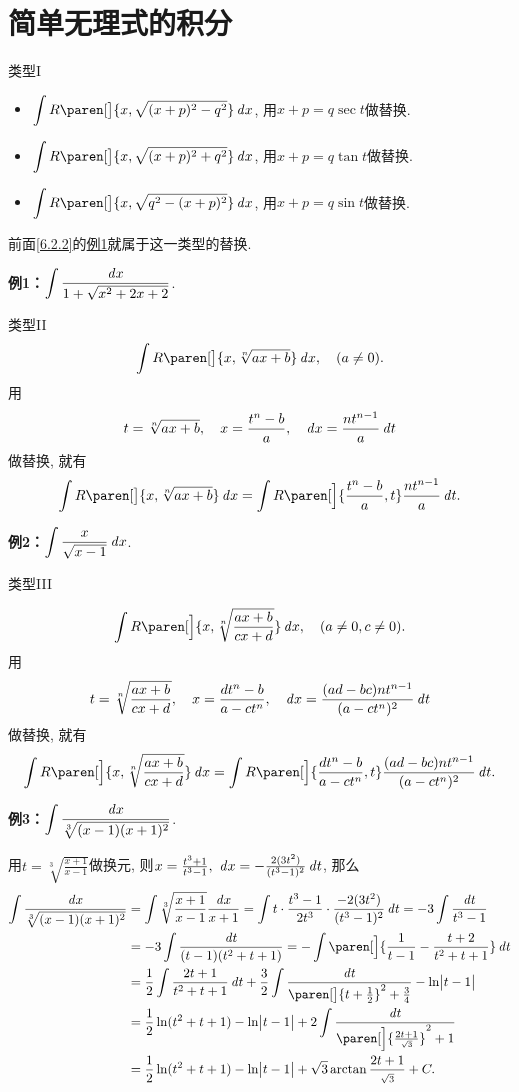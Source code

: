 \documentclass[a4paper,punct=CCT]{ctexbook}
\newcommand*{\ex}[2]{\textbf{例#1：}#2}
\newcommand*{\disp}[1]{\( \displaystyle #1 \)}
\newcommand*{\exds}[2]{\ex{#1}\disp{#2}}
\theoremstyle{break}
\begin{document}
\section{简单无理式的积分\label{6.5}}

类型I

\begin{itemize}
\item \(\displaystyle \int R\paren[\big]{x, \sqrt{(x+p)^2 - q^2}} \dx\), 用\(x + p = q \sec t\)做替换.
\item \(\displaystyle \int R\paren[\big]{x, \sqrt{(x+p)^2 + q^2}} \dx\), 用\(x + p = q \tan t\)做替换.
\item \(\displaystyle \int R\paren[\big]{x, \sqrt{q^2 - (x+p)^2}} \dx\), 用\(x + p = q \sin t\)做替换.
\end{itemize}

前面\ref{6.2.2}的\hyperlink{E:sinsub}{例1}就属于这一类型的替换.

\exds{1}{\int \frac{\dx}{1+\sqrt{x^2+2x+2}}}.

类型II
\[
  \int R\paren[\big]{x, \sqrt[n]{ax+b}} \dx, \quad (a \ne 0).
\]
用
\[
  t = \sqrt[n]{ax+b}, \quad
  x = \frac{t^n-b}{a}, \quad
  \mathop{}\!\mathit{d} x = \frac{nt^{n-1}}{a} \mathop{}\!\mathit{d} t
\]
做替换, 就有
\[
  \int R\paren[\big]{x, \sqrt[n]{ax+b}} \dx
  = \int R\paren[\Big]{\frac{t^n-b}{a}, t} \frac{nt^{n-1}}{a} \dt.
\]

\exds{2}{\int \frac{x}{\sqrt{x-1}} \dx}.

类型III

\[
  \int R\paren[\Big]{x, \sqrt[n]{\frac{ax+b}{cx+d}}} \dx, \quad (a \ne 0, c \ne 0).
\]
用
\[
  t = \sqrt[n]{\frac{ax+b}{cx+d}}, \quad
  x = \frac{dt^n-b}{a-ct^n}, \quad
  \mathop{}\!\mathit{d} x = \frac{(ad-bc)nt^{n-1}}{(a-ct^n)^2} \mathop{}\!\mathit{d} t
\]
做替换, 就有
\[
  \int R\paren[\Big]{x, \sqrt[n]{\frac{ax+b}{cx+d}}} \dx
  = \int R\paren[\Big]{\frac{dt^n-b}{a-ct^n}, t} \frac{(ad-bc)nt^{n-1}}{(a-ct^n)^2} \dt.
\]

\hypertarget{E:rootI}{}
\exds{3}{\int \frac{\dx}{\sqrt[3]{(x-1)(x+1)^2}}}.

用\(t = \sqrt[3]{\frac{x+1}{x-1}}\)做换元, 则\(x = \frac{t^3+1}{t^3-1},\ \mathop{}\!\mathit{d} x = -\frac{2(3t^2)}{(t^3-1)^2} \mathop{}\!\mathit{d} t\), 那么
\[
  \begin{split}
    \int \frac{\dx}{\sqrt[3]{(x-1)(x+1)^2}}
    &= \int \sqrt[3]{\frac{x+1}{x-1}} \frac{\dx}{x+1}
    = \int t \cdot \frac{t^3-1}{2t^3} \cdot \frac{-2(3t^2)}{(t^3-1)^2} \dt
    = -3 \int \frac{\dt}{t^3-1} \\
    &= -3 \int \frac{\dt}{(t-1)(t^2+t+1)}
    = - \int \paren[\Big]{\frac{1}{t-1} - \frac{t+2}{t^2+t+1}} \dt \\
    &= \frac12 \int \frac{2t+1}{t^2+t+1} \dt + \frac32 \int \frac{\dt}{\paren[\big]{t+\frac12}^2+\frac34} - \ln\abs[\big]{t-1} \\
    &= \frac12 \ln(t^2+t+1) - \ln\abs[\big]{t-1} + 2 \int \frac{\dt}{\paren[\Big]{\frac{2t+1}{\scriptscriptstyle\sqrt3}}^2 + 1} \\
    &= \frac12 \ln(t^2+t+1) - \ln\abs[\big]{t-1} + \sqrt3 \arctan \frac{2t+1}{\scriptstyle\sqrt3} + C.
  \end{split}
\]
\end{document}
